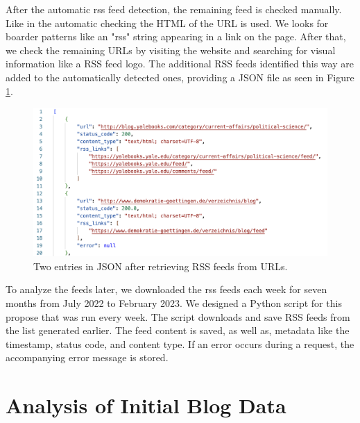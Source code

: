 \documentclass{article}
\begin{document}
After the automatic rss feed detection, the remaining feed is checked manually. Like in the automatic checking the HTML of the URL is used. We looks for boarder patterns like an "rss" string appearing in a link on the page. After that, we check the remaining URLs by visiting the website and searching for visual information like a RSS feed logo. The additional RSS feeds identified this way are added to the automatically detected ones, providing a JSON file as seen in Figure \ref{code:rss_list_json}.
\begin{figure}[htb]
	\includegraphics[width=.7\textwidth]{figures/rss_list_json.png}
	\caption{Two entries in JSON after retrieving RSS feeds from URLs.}
	\label{code:rss_list_json}
\end{figure}

To analyze the feeds later, we downloaded the rss feeds each week for seven months from July 2022 to February 2023. We designed a Python script for this propose that was run every week. The script downloads and save RSS feeds from the list generated earlier. The feed content is saved, as well as, metadata like the timestamp, status code, and content type. If an error occurs during a request, the accompanying error message is stored.

\section{Analysis of Initial Blog Data}\label{sec:analysis}
\end{document}
